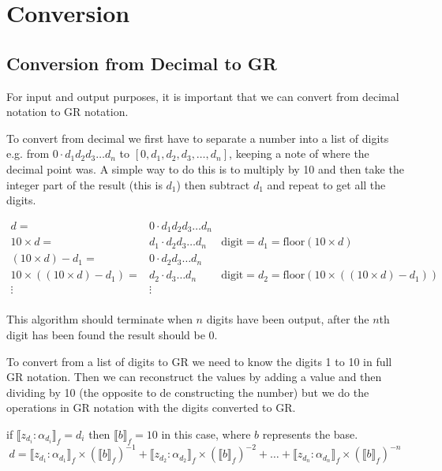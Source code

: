 \documentclass{cs4rep}
\begin{document}
\chapter{Conversion} \label{ch:c}
\section{Conversion from Decimal to GR}

For input and output purposes, it is important that we can convert from
decimal notation to GR notation.

To convert from decimal we first have to separate a number into a list
of digits e.g. from $0 \cdot d_{1} d_{2} d_{3} \ldots d_{n}$ to $[0,
d_{1}, d_{2}, d_{3}, \ldots, d_{n}]$, keeping a note of where the
decimal point was.  A simple way to do this is to multiply by 10 and
then take the integer part of the result (this is $d_{1}$) then
subtract $d_{1}$ and repeat to get all the digits.

\[ \begin{array}{rll}
d = & 0 \cdot d_{1} d_{2} d_{3} \ldots d_{n} & \\
10 \times d = & d_{1} \cdot d_{2} d_{3} \ldots d_{n} & \mbox{digit}=d_{1}=\mbox{floor}(10 \times d) \\
(10 \times d)-d_{1} = & 0 \cdot d_{2} d_{3} \ldots d_{n} & \\
10 \times ((10 \times d)-d_{1}) = & d_{2} \cdot d_{3} \ldots d_{n} & \mbox{digit}=d_{2}=\mbox{floor}(10 \times ((10 \times d)-d_{1})) \\
\vdots & \vdots & \\
\end{array}\]

This algorithm should terminate when $n$ digits have been output,
after the $n$th digit has been found the result should be 0.

To convert from a list of digits to GR we need to know the digits 1 to
10 in full GR notation. Then we can reconstruct the values by adding a
value and then dividing by 10 (the opposite to de constructing the
number) but we do the operations in GR notation with the digits
converted to GR.

if $ \llbracket z_{d_{i}}:\alpha_{d_{i}} \rrbracket_{f} = d_{i} $ then 
$\llbracket b \rrbracket_{f} = 10$ in this case, where $b$ represents the base. 
\[ d = \llbracket z_{d_{1}}:\alpha_{d_{1}} \rrbracket_{f} \times (\llbracket b \rrbracket_{f})^{-1} + \llbracket z_{d_{2}}:\alpha_{d_{2}} \rrbracket_{f} \times (\llbracket b \rrbracket_{f})^{-2} + \ldots + \llbracket z_{d_{n}}:\alpha_{d_{n}} \rrbracket_{f} \times (\llbracket b \rrbracket_{f})^{-n} \]
\end{document}
